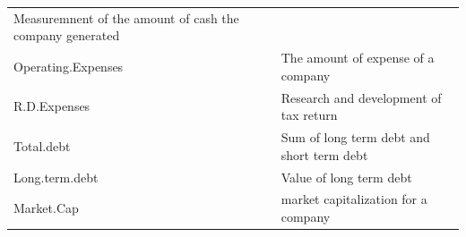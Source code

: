 \documentclass[11pt,]{article}
\begin{document}
\begin{longtable}[]{@{}lll@{}}
\begin{minipage}[t]{0.62\columnwidth}
Measuremnent of the amount of cash the company generated\strut
\end{minipage}\tabularnewline
\begin{minipage}[t]{0.19\columnwidth}\raggedright
Operating.Expenses\strut
\end{minipage} & \begin{minipage}[t]{0.10\columnwidth}\raggedright
\strut
\end{minipage} & \begin{minipage}[t]{0.62\columnwidth}\raggedright
The amount of expense of a company\strut
\end{minipage}\tabularnewline
\begin{minipage}[t]{0.19\columnwidth}\raggedright
R.D.Expenses\strut
\end{minipage} & \begin{minipage}[t]{0.10\columnwidth}\raggedright
\strut
\end{minipage} & \begin{minipage}[t]{0.62\columnwidth}\raggedright
Research and development of tax return\strut
\end{minipage}\tabularnewline
\begin{minipage}[t]{0.19\columnwidth}\raggedright
Total.debt\strut
\end{minipage} & \begin{minipage}[t]{0.10\columnwidth}\raggedright
\strut
\end{minipage} & \begin{minipage}[t]{0.62\columnwidth}\raggedright
Sum of long term debt and short term debt\strut
\end{minipage}\tabularnewline
\begin{minipage}[t]{0.19\columnwidth}\raggedright
Long.term.debt\strut
\end{minipage} & \begin{minipage}[t]{0.10\columnwidth}\raggedright
\strut
\end{minipage} & \begin{minipage}[t]{0.62\columnwidth}\raggedright
Value of long term debt\strut
\end{minipage}\tabularnewline
\begin{minipage}[t]{0.19\columnwidth}\raggedright
Market.Cap\strut
\end{minipage} & \begin{minipage}[t]{0.10\columnwidth}\raggedright
\strut
\end{minipage} & \begin{minipage}[t]{0.62\columnwidth}\raggedright
market capitalization for a company\strut
\end{minipage}\tabularnewline
\bottomrule
\end{longtable}
\end{document}

